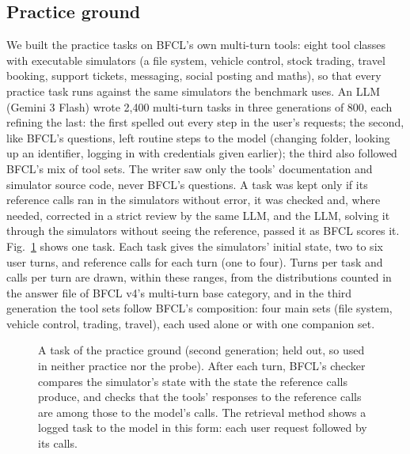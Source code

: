 \documentclass[a4paper,fleqn]{cas-dc}
\begin{document}
\subsection{Practice ground}\label{sec:ground}
We built the practice tasks on BFCL's own multi-turn tools: eight tool classes with executable simulators (a file
system, vehicle control, stock trading, travel booking, support tickets, messaging, social posting and maths), so that
every practice task runs against the same simulators the benchmark uses. An LLM (Gemini 3 Flash) wrote 2,400 multi-turn
tasks in three generations of 800, each refining the last: the first spelled out every step in the user's requests;
the second, like BFCL's questions, left routine steps to the model (changing folder, looking up an identifier, logging
in with credentials given earlier); the third also followed BFCL's mix of tool sets. The writer saw only the tools'
documentation and simulator source code, never BFCL's questions. A task was kept only if its reference calls ran in the
simulators without error, it was checked and, where needed, corrected in a strict review by the same LLM, and the LLM, solving it through the simulators
without seeing the reference, passed it as BFCL scores it. Fig.~\ref{fig:task} shows one task. Each task gives the simulators' initial state, two to six user turns, and reference calls for each turn (one
to four). Turns per task and calls per turn are drawn, within these ranges, from the distributions counted in the answer file of
BFCL v4's multi-turn base category, and in the third generation the tool sets follow BFCL's composition: four main
sets (file system, vehicle control, trading, travel), each used alone or with one companion set.

\begin{figure}[t]
\centering\small
{}
\caption{A task of the practice ground (second generation; held out, so used in neither practice nor the probe). After each turn, BFCL's checker compares the simulator's state with the
state the reference calls produce, and checks that the tools' responses to the reference calls are among those to the
model's calls. The retrieval method shows a logged task to the model in this form: each user request followed by its
calls.}\label{fig:task}
\end{figure}
\end{document}
